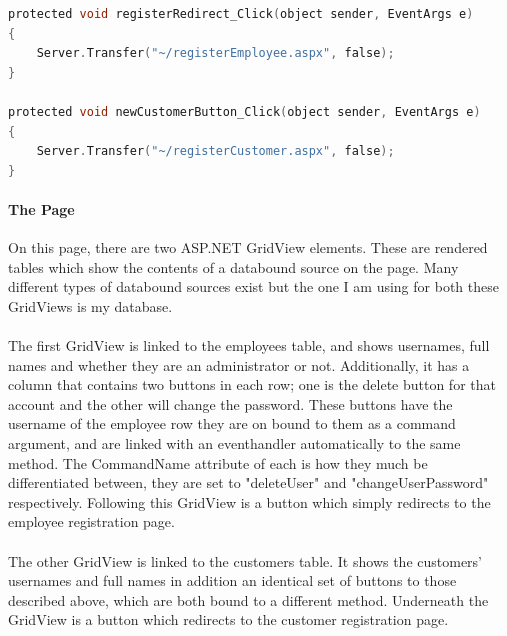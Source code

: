 ﻿\documentclass{article}
\begin{document}
\begin{lstlisting}[language=C]
protected void registerRedirect_Click(object sender, EventArgs e)
{
    Server.Transfer("~/registerEmployee.aspx", false);
}

protected void newCustomerButton_Click(object sender, EventArgs e)
{
    Server.Transfer("~/registerCustomer.aspx", false);
}
    \end{lstlisting}
    \paragraph{The Page}
    On this page, there are two ASP.NET GridView elements.
    These are rendered tables which show the contents of a databound source on the page.
    Many different types of databound sources exist but the one I am using for both these GridViews is my database.
    \paragraph{}
    The first GridView is linked to the employees table, and shows usernames, full names and whether they are an administrator or not.
    Additionally, it has a column that contains two buttons in each row; one is the delete button for that account and the other will change the password.
    These buttons have the username of the employee row they are on bound to them as a command argument, and are linked with an eventhandler automatically to the same method.
    The CommandName attribute of each is how they much be differentiated between, they are set to "deleteUser" and "changeUserPassword" respectively.
    Following this GridView is a button which simply redirects to the employee registration page.
    \paragraph{}
    The other GridView is linked to the customers table.
    It shows the customers' usernames and full names in addition an identical set of buttons to those described above, which are both bound to a different method.
    Underneath the GridView is a button which redirects to the customer registration page.
\end{document}
